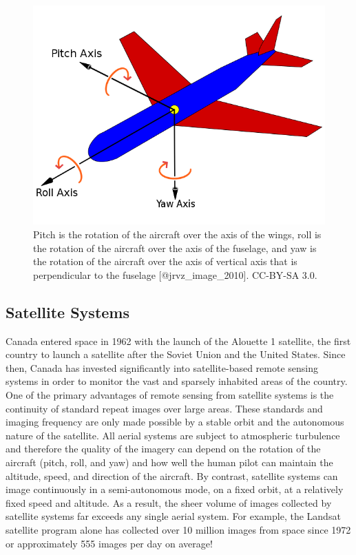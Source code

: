 \documentclass[
]{book}
\begin{document}
\begin{figure}
\includegraphics[width=0.9\linewidth]{images/12-pitch-roll-yaw} \caption{Pitch is the rotation of the aircraft over the axis of the wings, roll is the rotation of the aircraft over the axis of the fuselage, and yaw is the rotation of the aircraft over the axis of vertical axis that is perpendicular to the fuselage [@jrvz_image_2010]. CC-BY-SA 3.0.}\label{fig:12-pitch-roll-yaw}
\end{figure}

\hypertarget{satellite-systems}{%
\subsection{Satellite Systems}\label{satellite-systems}}

Canada entered space in 1962 with the launch of the Alouette 1 satellite, the first country to launch a satellite after the Soviet Union and the United States. Since then, Canada has invested significantly into satellite-based remote sensing systems in order to monitor the vast and sparsely inhabited areas of the country. One of the primary advantages of remote sensing from satellite systems is the continuity of standard repeat images over large areas. These standards and imaging frequency are only made possible by a stable orbit and the autonomous nature of the satellite. All aerial systems are subject to atmospheric turbulence and therefore the quality of the imagery can depend on the rotation of the aircraft (pitch, roll, and yaw) and how well the human pilot can maintain the altitude, speed, and direction of the aircraft. By contrast, satellite systems can image continuously in a semi-autonomous mode, on a fixed orbit, at a relatively fixed speed and altitude. As a result, the sheer volume of images collected by satellite systems far exceeds any single aerial system. For example, the Landsat satellite program alone has collected over 10 million images from space since 1972 or approximately 555 images per day on average!
\end{document}
